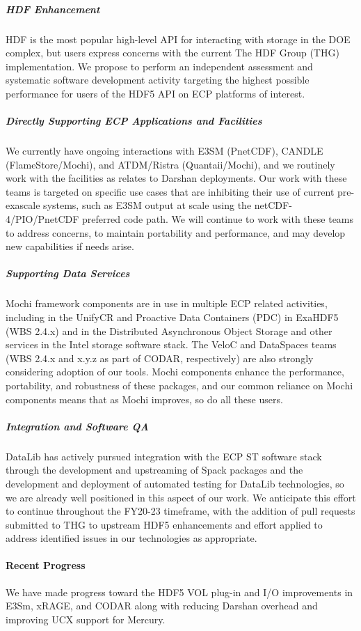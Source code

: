 \subparagraph{HDF Enhancement} HDF is the most popular high-level API for
interacting with storage in the DOE complex, but users express concerns
with the current The HDF Group (THG) implementation. We propose to perform
an independent assessment and systematic software development activity
targeting the highest possible performance for users of the HDF5 API on
ECP platforms of interest.

\subparagraph{Directly Supporting ECP Applications and Facilities} We currently
have ongoing interactions with E3SM (PnetCDF), CANDLE (FlameStore/Mochi),
and ATDM/Ristra (Quantaii/Mochi), and we routinely work with the
facilities as relates to Darshan deployments. Our work with these
teams is targeted on specific use cases that are inhibiting their use
of current pre-exascale systems, such as E3SM output at scale using the
netCDF-4/PIO/PnetCDF preferred code path. We will continue to work with
these teams to address concerns, to maintain portability and performance,
and may develop new capabilities if needs arise. 

\subparagraph{Supporting Data Services} Mochi framework components are in use in
multiple ECP related activities, including in the UnifyCR and Proactive
Data Containers (PDC) in ExaHDF5 (WBS 2.4.x) and in the Distributed
Asynchronous Object Storage and other services in the Intel storage
software stack. The VeloC and DataSpaces teams (WBS 2.4.x and x.y.z as
part of CODAR, respectively) are also strongly considering adoption
of our tools. Mochi components enhance the performance, portability,
and robustness of these packages, and our common reliance on Mochi
components means that as Mochi improves, so do all these users.

\subparagraph{Integration and Software QA} DataLib has actively pursued
integration with the ECP ST software stack through the development
and upstreaming of Spack packages and the development and deployment
of automated testing for DataLib technologies, so we are already well
positioned in this aspect of our work. We anticipate this effort to
continue throughout the FY20-23 timeframe, with the addition of pull
requests submitted to THG to upstream HDF5 enhancements and effort applied
to address identified issues in our technologies as appropriate.

\paragraph{Recent Progress} We have made progress toward the HDF5 VOL plug-in and I/O improvements in E3Sm, xRAGE, and CODAR along with reducing Darshan overhead and improving UCX support for Mercury.

